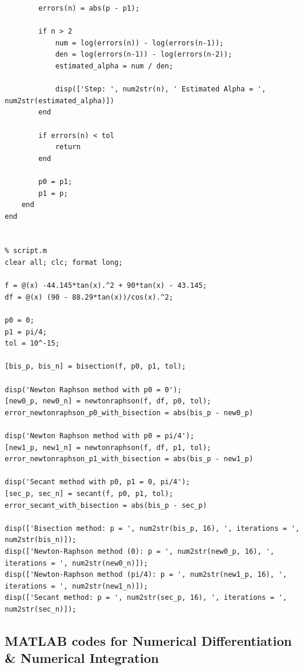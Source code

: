 \documentclass{article}
\begin{document}
\begin{lstlisting}
        errors(n) = abs(p - p1);
        
        if n > 2
            num = log(errors(n)) - log(errors(n-1));
            den = log(errors(n-1)) - log(errors(n-2));
            estimated_alpha = num / den;

            disp(['Step: ', num2str(n), ' Estimated Alpha = ', num2str(estimated_alpha)])
        end

        if errors(n) < tol
            return
        end

        p0 = p1; 
        p1 = p;
    end
end


% script.m
clear all; clc; format long;

f = @(x) -44.145*tan(x).^2 + 90*tan(x) - 43.145;
df = @(x) (90 - 88.29*tan(x))/cos(x).^2;

p0 = 0;
p1 = pi/4;
tol = 10^-15;

[bis_p, bis_n] = bisection(f, p0, p1, tol);

disp('Newton Raphson method with p0 = 0');
[new0_p, new0_n] = newtonraphson(f, df, p0, tol);
error_newtonraphson_p0_with_bisection = abs(bis_p - new0_p)

disp('Newton Raphson method with p0 = pi/4');
[new1_p, new1_n] = newtonraphson(f, df, p1, tol);
error_newtonraphson_p1_with_bisection = abs(bis_p - new1_p)

disp('Secant method with p0, p1 = 0, pi/4');
[sec_p, sec_n] = secant(f, p0, p1, tol);
error_secant_with_bisection = abs(bis_p - sec_p)

disp(['Bisection method: p = ', num2str(bis_p, 16), ', iterations = ', num2str(bis_n)]);
disp(['Newton-Raphson method (0): p = ', num2str(new0_p, 16), ', iterations = ', num2str(new0_n)]);
disp(['Newton-Raphson method (pi/4): p = ', num2str(new1_p, 16), ', iterations = ', num2str(new1_n)]);
disp(['Secant method: p = ', num2str(sec_p, 16), ', iterations = ', num2str(sec_n)]);
\end{lstlisting}

\bigskip 

\subsection*{MATLAB codes for Numerical Differentiation \& Numerical Integration}
\end{document}
